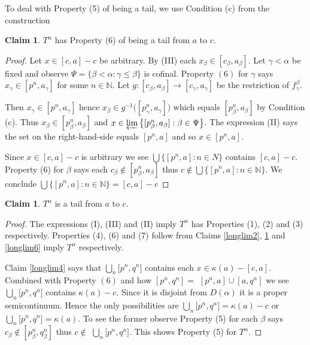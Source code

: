 \documentclass[12pt]{article}
\theoremstyle{plain}
\theoremstyle{definition}
\newcounter{ClaimCounter}
\newtheorem{claim}[ClaimCounter]{Claim}
\newcounter{claim5counter}
\newcommand{\A}{\ensuremath{\alpha}}
\newcommand{\K}{\ensuremath{\kappa}}
\newcommand{\B}{\ensuremath{\beta}}
\newcommand{\G}{\ensuremath{\gamma}}
\newcommand{\NN}{\ensuremath{\mathbb N}}
\newcommand{\0}{\ensuremath{\varnothing}}
\begin{document}
	To deal with Property (5) of being a tail, we use Condition (c) from the construction 
	
	
	\begin{claim}\label{longlim5}
		$T^\A$ has Property (6) of being a tail from $a$ to $c$.
	\end{claim}
	
	\begin{proof}
		Let $x \in [c,a] -c$ be arbitrary.
		By (III) each $x_\B \in [c_\B,a_\B]$.
		Let $\G < \A$ be fixed and observe $\Psi = \{\B < \A: \G \le \B\}$ is cofinal.
		Property $(6)$ for $\G$ says $x_\G \in [p^n,a_\G]$ for some $n \in \NN$.
		Let $g: [c_\B,a_\B] \to [c_\G,a_\G]$ be the restriction of $f^\B_\G$.
		
		Then $x_\G \in [p^n,a_\G]$ hence $x_\B \in g^{-1}\big ( [p^n_\G,a_\G] \big )$ which equals $ [p^n_\B,a_\B]$ 
		by Condition (c).
		Thus $x_\B \in [p^n_\B,a_\B]$ and $x \in \varprojlim \big \{ [p^n_\B,a_\B]: \B \in \Psi \big \}$.
		The expression (II) says the set on the right-hand-side equals $[p^n,a]$ and so \mbox{$x \in [p^n,a]$}.  
		
		
		Since  $x \in [c,a] -c$ is arbitrary we see $\bigcup \big \{[p^n,a]: n \in N \big \}$ contains \mbox{$[c,a]-c$}.
		Property (6) for $\B$ says each $c_\B \notin [p^n_\B,a_\B]$ thus $c \notin \bigcup \big \{[p^n,a]: n \in \NN \big \}$.
		We conclude $\bigcup \big \{[p^n,a]: n \in \NN \big \} = [c,a]-c$
	\end{proof}
	
	\begin{claim}\label{goodlim}
		$T^\A$ is a tail from $a$ to $c$.
	\end{claim}
	
	\begin{proof}
		
		The expressions (I), (III) and (II) imply $T^\A$ has Properties (1), (2) and (3) respectively.
		Properties (4), (6) and (7) follow from Claims \ref{longlim2}, \ref{longlim5} and \ref{longlim6} imply $T^\A$ respectively.
		
		Claim \ref{longlim4} says that $\bigcup_n \big [p^n,q^n]$ contains each \mbox{$x \in \K(a) - [c,a]$}.
		Combined with Property $(6)$ and how $[p^n,q^n] = $ $[p^n,a] \cup [a,q^n]$ we see $\bigcup_n \big [p^n,q^n]$ contains \mbox{$\K(a)-c$}. Since it is disjoint from $D(\A)$ it is a proper semicontinuum. Hence the only possibilities are  $\bigcup_n \big [p^n,q^n] =\K(a)-c$ or $\bigcup_n \big [p^n,q^n] =\K(a)$.
		To see the former observe Property (5) for each $\B$ says $c_\B \notin [p^n_\B,q^n_\B]$ thus $c \notin $ $\bigcup_n \big [p^n,q^n]$. This shows Property (5) for $T^\A$.
	\end{proof}
	
\end{document}
